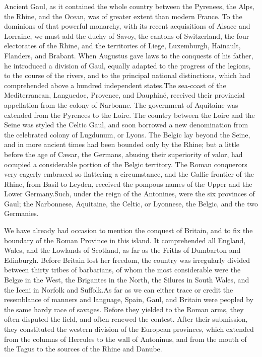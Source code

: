 Ancient Gaul, as it contained the whole country between the
Pyrenees, the Alps, the Rhine, and the Ocean, was of greater
extent than modern France. To the dominions of that powerful
monarchy, with its recent acquisitions of Alsace and Lorraine, we
must add the duchy of Savoy, the cantons of Switzerland, the four
electorates of the Rhine, and the territories of Liege,
Luxemburgh, Hainault, Flanders, and Brabant. When Augustus gave
laws to the conquests of his father, he introduced a division of
Gaul, equally adapted to the progress of the legions, to the
course of the rivers, and to the principal national distinctions,
which had comprehended above a hundred independent states.\footnotemark[71] The
sea-coast of the Mediterranean, Languedoc, Provence, and
Dauphiné, received their provincial appellation from the colony
of Narbonne. The government of Aquitaine was extended from the
Pyrenees to the Loire. The country between the Loire and the
Seine was styled the Celtic Gaul, and soon borrowed a new
denomination from the celebrated colony of Lugdunum, or Lyons.
The Belgic lay beyond the Seine, and in more ancient times had
been bounded only by the Rhine; but a little before the age of
Cæsar, the Germans, abusing their superiority of valor, had
occupied a considerable portion of the Belgic territory. The
Roman conquerors very eagerly embraced so flattering a
circumstance, and the Gallic frontier of the Rhine, from Basil to
Leyden, received the pompous names of the Upper and the Lower
Germany.\footnotemark[72] Such, under the reign of the Antonines, were the six
provinces of Gaul; the Narbonnese, Aquitaine, the Celtic, or
Lyonnese, the Belgic, and the two Germanies.



We have already had occasion to mention the conquest of Britain,
and to fix the boundary of the Roman Province in this island. It
comprehended all England, Wales, and the Lowlands of Scotland, as
far as the Friths of Dumbarton and Edinburgh. Before Britain lost
her freedom, the country was irregularly divided between thirty
tribes of barbarians, of whom the most considerable were the
Belgæ in the West, the Brigantes in the North, the Silures in
South Wales, and the Iceni in Norfolk and Suffolk.\footnotemark[73] As far as
we can either trace or credit the resemblance of manners and
language, Spain, Gaul, and Britain were peopled by the same hardy
race of savages. Before they yielded to the Roman arms, they
often disputed the field, and often renewed the contest. After
their submission, they constituted the western division of the
European provinces, which extended from the columns of Hercules
to the wall of Antoninus, and from the mouth of the Tagus to the
sources of the Rhine and Danube.

